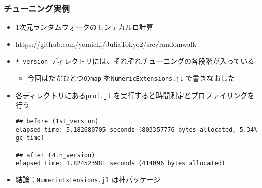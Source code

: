  \begin{frame}[containsverbatim]
 \frametitle{チューニング実例}
 \begin{itemize}
   \item 1次元ランダムウォークのモンテカルロ計算
   \item https://github.com/yomichi/JuliaTokyo2/src/randomwalk
   \item \verb|*_version| ディレクトリには、それぞれチューニングの各段階が入っている
     \begin{itemize}
       \item 今回はただひとつの\verb|map| を\verb|NumericExtensions.jl| で書きなおした
     \end{itemize}
   \item 各ディレクトリにある\verb|prof.jl| を実行すると時間測定とプロファイリングを行う
\begin{lstlisting}
## before (1st_version)
elapsed time: 5.182680705 seconds (803357776 bytes allocated, 5.34% gc time)

## after (4th_version)
elapsed time: 1.824523981 seconds (414096 bytes allocated)
\end{lstlisting}
\item 結論：\verb|NumericExtensions.jl| は神パッケージ
 \end{itemize}
 \end{frame}
